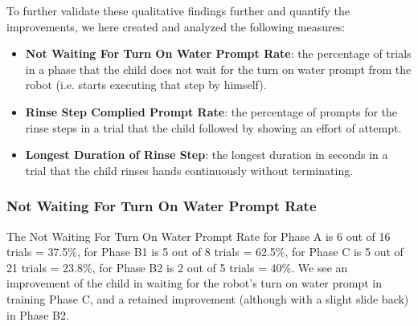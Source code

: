 %
To further validate these qualitative findings further and quantify the improvements, we here created and analyzed the following measures:
\begin{itemize}
	\item \textbf{Not Waiting For Turn On Water Prompt Rate}: the percentage of trials in a phase that the child does not wait for the turn on water prompt from the robot (i.e. starts executing that step by himself).
	\item \textbf{Rinse Step Complied Prompt Rate}: the percentage of prompts for the rinse steps in a trial that the child followed by showing an effort of attempt.
	\item \textbf{Longest Duration of Rinse Step}: the longest duration in seconds in a trial that the child rinses hands continuously without terminating.
\end{itemize}
\subsubsection{Not Waiting For Turn On Water Prompt Rate}
The Not Waiting For Turn On Water Prompt Rate for Phase A is 6 out of 16 trials = 37.5\%, for Phase B1 is 5 out of 8 trials = 62.5\%, for Phase C is 5 out of 21 trials = 23.8\%, for Phase B2 is 2 out of 5 trials = 40\%.  We see an improvement of the child in waiting for the robot's turn on water prompt in training Phase C, and a retained improvement (although with a slight slide back) in Phase B2.

